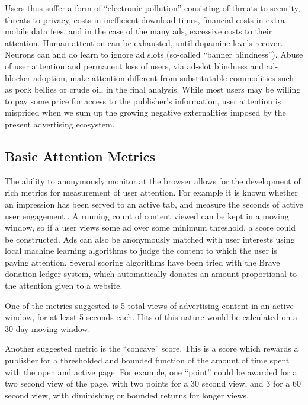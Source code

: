 \documentclass[11pt]{article}
\begin{document}
Users thus suffer a form of “electronic pollution” consisting of threats to security, threats to privacy, costs in inefficient download times, financial costs in extra mobile data fees, and in the case of the many ads, excessive costs to their attention. Human attention can be exhausted, until dopamine levels recover. Neurons can and do learn to ignore ad slots (so-called “banner blindness”). Abuse of user attention and permanent loss of users, via ad-slot blindness and ad-blocker adoption, make attention different from substitutable commodities such as pork bellies or crude oil, in the final analysis. While most users may be willing to pay some price for access to the publisher’s information, user attention is mispriced when we sum up the growing negative externalities imposed by the present advertising ecosystem.

\subsection{Basic Attention Metrics}
\label{sec-4-1}

The ability to anonymously monitor at the browser allows for the development of rich metrics for measurement of user attention. For example it is known whether an impression has been served to an active tab, and measure the seconds of active user engagement.. A running count of content viewed can be kept in a moving window, so if a user views some ad over some minimum threshold, a score could be constructed. Ads can also be anonymously matched with user interests using local machine learning algorithms to judge the content to which the user is paying attention. Several scoring algorithms have been tried with the Brave donation \href{https://github.com/brave/ledger-client}{ledger system}, which automatically donates an amount proportional to the attention given to a website. 

One of the metrics suggested is 5 total views of advertising content in an active window, for at least 5 seconds each. Hits of this nature would be calculated on a 30 day moving window. 

Another suggested metric is the “concave” score. This is a score which rewards a publisher for a thresholded and bounded function of the amount of time spent with the open and active page.  For example, one “point” could be awarded for a two second view of the page, with two points for a 30 second view, and 3 for a 60 second view, with diminishing or bounded returns for longer views.
\end{document}
